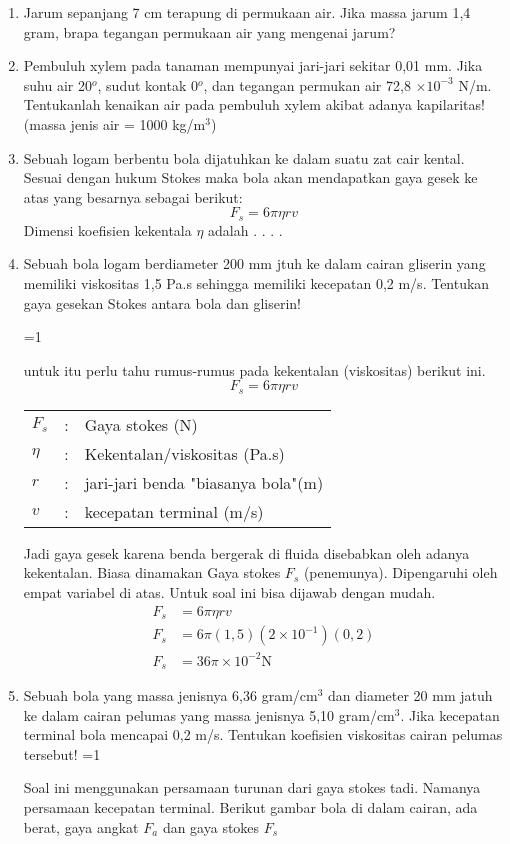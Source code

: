 \documentclass[14pt,a4paper]{extarticle}
\def\tampilkunci{0}
\newcommand{\hide}[1]{\ifnum\tampilkunci=1
%
\begin{mybox}
 #1
\end{mybox}
%
\vspace{\baselineskip}\fi}
\newcommand{\pers}[1]{\begin{align*} #1 \end{align*}}
\newcommand{\sci}[1]{$\times 10^{#1}$}
\newcommand{\scip}[1]{\times 10^{#1}}
\begin{document}
\begin{enumerate}[itemsep=0mm]

\item Jarum sepanjang 7 cm terapung di permukaan air. Jika massa jarum 1,4 gram, brapa tegangan permukaan air yang mengenai jarum?


\item Pembuluh xylem pada tanaman mempunyai jari-jari sekitar 0,01 mm. Jika suhu air 20$^o$, sudut kontak 0$^o$, dan tegangan permukan air 72,8 \sci{-3} N/m. Tentukanlah kenaikan air pada pembuluh xylem akibat adanya kapilaritas! (massa jenis air  = 1000 kg/m$^3$)

\item Sebuah logam berbentu bola dijatuhkan ke dalam suatu zat cair kental. Sesuai dengan hukum Stokes maka bola akan mendapatkan gaya gesek ke atas yang besarnya sebagai berikut:
$$ F_s = 6 \pi \eta r v $$
Dimensi koefisien kekentala $\eta$ adalah . . . .

 

\item Sebuah bola logam berdiameter 200 mm jtuh ke dalam cairan gliserin yang memiliki viskositas 1,5 Pa.s sehingga memiliki kecepatan 0,2 m/s. Tentukan gaya gesekan Stokes antara bola dan gliserin!

\hide{
untuk itu perlu tahu rumus-rumus pada kekentalan (viskositas) berikut ini.
$$F_s= 6 \pi \eta r v $$
\begin{tabular}{lcl}
$F_s$ &:& Gaya stokes (N) \\
$\eta$ &:& Kekentalan/viskositas (Pa.s)\\
$r$ &:& jari-jari benda "biasanya bola"(m) \\
$v$ &:& kecepatan terminal (m/s) \\
\end{tabular}

Jadi gaya gesek karena benda bergerak di fluida disebabkan oleh adanya kekentalan. Biasa dinamakan Gaya stokes $F_s$ (penemunya). Dipengaruhi oleh empat variabel di atas. Untuk soal ini bisa dijawab dengan mudah.
\pers{
F_s&=6\pi \eta r v \\
F_s&=6\pi (1,5)(2\scip{-1})(0,2)\\
F_s&=36 \pi \scip{-2} \text{N}
} 
}

\item Sebuah bola yang massa jenisnya 6,36 gram/cm$^3$ dan diameter 20 mm jatuh ke dalam cairan pelumas yang massa jenisnya 5,10 gram/cm$^3$. Jika kecepatan terminal bola mencapai 0,2 m/s. Tentukan koefisien viskositas cairan pelumas tersebut!
\hide{
Soal ini menggunakan persamaan turunan dari gaya stokes tadi. Namanya persamaan kecepatan terminal. Berikut gambar bola di dalam cairan, ada berat, gaya angkat $F_a$ dan gaya stokes $F_s$

}
\end{enumerate}
\end{document}
